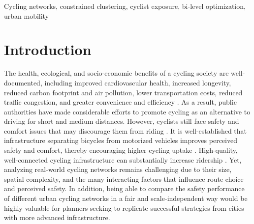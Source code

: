 \documentclass[lettersize,journal]{IEEEtran}
\begin{document}
\begin{abstract}
Comparing cycling networks across cities is challenging because networks differ in size, resolution, topology, and safety characteristics. Building on an existing exposure-based optimization model for cycling-infrastructure upgrades, this paper proposes a safety-aware framework for clustering, comparing, and transferring intervention strategies across urban cycling networks. Each network
is represented as a weighted directed graph whose arcs encode degree of separation, distance, cyclist flow, traffic exposure, slope, and angular change. We introduce a constrained clustering method that reduces large networks to a common resolution while preserving safety-relevant quantities such as exposure, flow, and DoS consistency. This enables fair cross-city comparison using an exposure-based Gromov--Wasserstein distance, and allows clustered optimization solutions to be lifted back to the original network. We further use the Gromov--Wasserstein correspondence to transfer optimized strategies from a source city to structurally similar target cities. A case study on Grenoble, Strasbourg, and Lyon shows that the clustered representation preserves optimization quality while reducing runtime, and that GW similarity provides an interpretable signal for cross-city transferability of cycling-infrastructure interventions.
\end{abstract}

\begin{IEEEkeywords}
Cycling networks, constrained clustering, cyclist exposure, bi-level optimization, urban mobility
\end{IEEEkeywords}

\section{Introduction}
\label{introduction}
The health, ecological, and socio-economic benefits of a cycling society are well-documented, including improved cardiovascular health, increased longevity, reduced carbon footprint and air pollution, lower transportation costs, reduced traffic congestion, and greater convenience and efficiency \cite{garrard2012health, gotschi2016cycling}. As a result, public authorities have made considerable efforts to promote cycling as an alternative to driving for short and medium distances. However, cyclists still face safety and comfort issues that may discourage them from riding \cite{fishman2012barriers}. It is well-established that infrastructure separating bicycles from motorized vehicles improves perceived safety and comfort, thereby encouraging higher cycling uptake \cite{lawrence2018cyclist, broach2012cyclists}. High-quality, well-connected cycling infrastructure can substantially increase ridership \cite{pucher2011walking, pucher2017cycling}. Yet, analyzing real-world cycling networks remains challenging due to their size, spatial complexity, and the many interacting factors that influence route choice and perceived safety. In addition, being able to compare the safety performance of different urban cycling networks in a fair and scale-independent way would be highly valuable for planners seeking to replicate successful strategies from cities with more advanced infrastructure.
\end{document}
